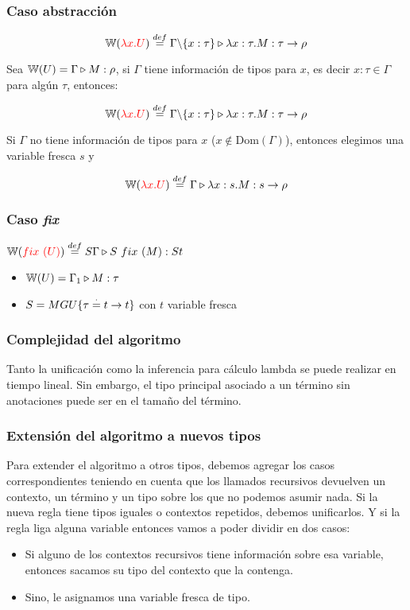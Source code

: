 \subsubsection{Caso abstracción}
$$\mathbb{W}({\color{red}\lambda x. U}) \overset{def}{=} \Gamma \backslash\{x:\tau\}\triangleright \lambda x: \tau . M : \tau\to\rho$$


Sea $\mathbb{W}(U) = \Gamma\triangleright M : \rho$, si $\Gamma$ tiene información de tipos para $x$, es decir $x:\tau\in\Gamma$ para algún $\tau$, entonces:

$$\mathbb{W}({\color{red}\lambda x. U}) \overset{def}{=} \Gamma \backslash\{x:\tau\}\triangleright \lambda x: \tau . M : \tau\to\rho$$

Si $\Gamma$ no tiene información de tipos para $x$ ($x\notin \text{Dom}(\Gamma)$), entonces elegimos una variable fresca $s$ y

$$\mathbb{W}({\color{red}\lambda x. U}) \overset{def}{=} \Gamma\triangleright \lambda x: s . M : s\to\rho$$

\subsubsection{Caso \textit{fix}}
$\mathbb{W}({\color{red}fix~(U)}) \overset{def}{=} S\Gamma\triangleright S~fix~(M) : St$
\begin{centrado}
	\begin{itemize}
		\item $\mathbb{W}(U) = \Gamma_1\triangleright M : \tau$
		\item $S = MGU\{\tau\overset{\cdot}{=} t\to t\}$ con $t$ variable fresca
	\end{itemize}
\end{centrado}

\subsubsection{Complejidad del algoritmo}
Tanto la unificación como la inferencia para cálculo lambda se puede realizar en tiempo lineal. Sin embargo, el tipo principal asociado a un término sin anotaciones puede ser  en el tamaño del término.

\subsubsection{Extensión del algoritmo a nuevos tipos}
Para extender el algoritmo a otros tipos, debemos agregar los casos correspondientes teniendo en cuenta que los llamados recursivos devuelven un contexto, un término y un tipo sobre los que no podemos asumir nada.
Si la nueva regla tiene tipos iguales o contextos repetidos, debemos unificarlos. Y si la regla liga alguna variable entonces vamos a poder dividir en dos casos: 
\begin{itemize}
	\item Si alguno de los contextos recursivos tiene información sobre esa variable, entonces sacamos su tipo del contexto que la contenga.
	\item Sino, le asignamos una variable fresca de tipo.
\end{itemize}

